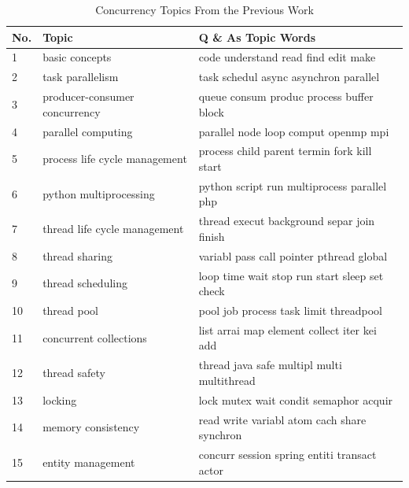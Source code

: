 \begin{table}[tbp]
\caption{Concurrency Topics From the Previous Work \cite{ahmed2018concurrency}}
\centering
\label{tab:CT}
\begin{tabular}{p{.15in}p{2.25in}p{3.1in}}\hline
\textbf{No.}&\textbf{Topic}&\textbf{Q \& As Topic Words}\\ \hline
1&basic concepts & 
code understand read find edit make\\

2&task parallelism & 
task schedul async asynchron parallel\\

3&producer-consumer concurrency & 
queue consum produc process buffer block\\

4&parallel computing & 
parallel node loop comput openmp mpi\\

5&process life cycle management& 
process child parent termin fork kill start\\

6&python multiprocessing& 
python script run multiprocess parallel php\\

7&thread life cycle management& 
thread execut background separ join finish\\

8&thread sharing& 
variabl pass call pointer pthread global\\

9&thread scheduling& 
loop time wait stop run start sleep set check\\

10&thread pool & 
pool job process task limit threadpool\\

11&concurrent collections& 
list arrai map element collect iter kei add\\

12&thread safety& 
thread java safe multipl multi multithread\\

13&locking& 
lock mutex wait condit semaphor acquir\\

14&memory consistency& 
read write variabl atom cach share synchron\\

15&entity management& 
concurr session spring entiti transact actor\\


\end{tabular}
\end{table}
